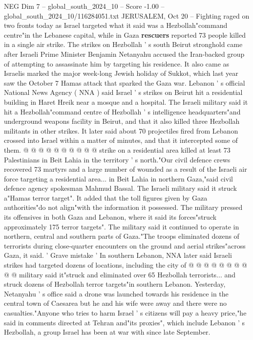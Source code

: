 \begin{textsample}{NEG Dim 7 – global\_south\_2024\_10 – Score -1.00 – global\_south\_2024\_10/116284051.txt}  \label{ex:f7_neg_239}
JERUSALEM, Oct 20 -- Fighting raged on two fronts today as Israel targeted what it said was a Hezbollah"command centre"in the Lebanese capital, while in Gaza \textbf{rescuers} reported 73 people killed in a single air strike.
The strikes on Hezbollah ' s south Beirut stronghold came after Israeli Prime Minister Benjamin Netanyahu accused the Iran-backed group of attempting to assassinate him by targeting his residence.
It also came as Israelis marked the major week-long Jewish holiday of Sukkot, which last year saw the October 7 Hamas attack that sparked the Gaza war.
Lebanon ' s official National News Agency ( NNA ) said Israel ' s strikes on Beirut hit a residential building in Haret Hreik near a mosque and a hospital.
The Israeli military said it hit a Hezbollah"command centre of Hezbollah ' s intelligence headquarters"and underground weapons facility in Beirut, and that it also killed three Hezbollah militants in other strikes.
It later said about 70 projectiles fired from Lebanon crossed into Israel within a matter of minutes, and that it intercepted some of them. @ @ @ @ @ @ @ @ @ @ strike on a residential area killed at least 73 Palestinians in Beit Lahia in the territory ' s north."Our civil defence crews recovered 73 martyrs and a large number of wounded as a result of the Israeli air force targeting a residential area... in Beit Lahia in northern Gaza,"said civil defence agency spokesman Mahmud Bassal.
The Israeli military said it struck a"Hamas terror target".
It added that the toll figures given by Gaza authorities"do not align"with the information it possessed.
The military pressed its offensives in both Gaza and Lebanon, where it said its forces"struck approximately 175 terror targets".
The military said it continued to operate in northern, central and southern parts of Gaza."The troops eliminated dozens of terrorists during close-quarter encounters on the ground and aerial strikes"across Gaza, it said. ' Grave mistake ' In southern Lebanon, NNA later said Israeli strikes had targeted dozens of locations, including the city of @ @ @ @ @ @ @ @ @ @ military said it"struck and eliminated over 65 Hezbollah terrorists... and struck dozens of Hezbollah terror targets"in southern Lebanon.
Yesterday, Netanyahu ' s office said a drone was launched towards his residence in the central town of Caesarea but he and his wife were away and there were no casualties."Anyone who tries to harm Israel ' s citizens will pay a heavy price,"he said in comments directed at Tehran and"its proxies", which include Lebanon ' s Hezbollah, a group Israel has been at war with since late September.

\end{textsample}
